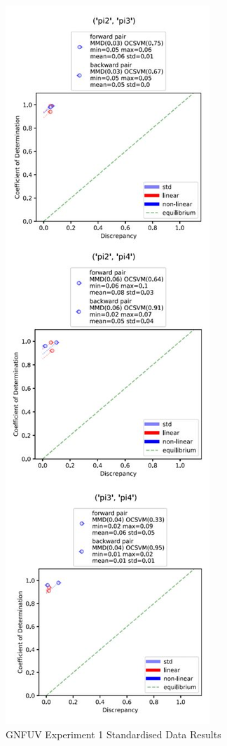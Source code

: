 \documentclass{mpaper}
\begin{document}
\begin{figure}
    \centering
    \includegraphics[scale = 0.7]{experiment_1_std.jpg}
    \caption{GNFUV Experiment 1 Standardised Data Results}
    \label{fig:gnfuv_exp1_std}
\end{figure}
\end{document}

